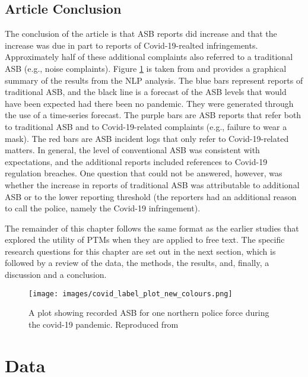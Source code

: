 \subsection{Article Conclusion}The conclusion of the article is that ASB reports did increase and that the increase was due in part to reports of Covid-19-realted infringements. Approximately half of these additional complaints also referred to a traditional ASB (e.g., noise complaints). Figure \ref{fig:ASB}  is taken from \parencite{halford_dixon_farrell_2022}  and provides a graphical summary of the results from the NLP analysis. The blue bars represent reports of traditional ASB, and the black line is a forecast of the ASB levels that would have been expected had there been no pandemic. They were generated through the use of a time-series forecast. The purple bars are ASB reports that refer both to traditional ASB and to Covid-19-related complaints (e.g., failure to wear a mask). The red bars are ASB incident logs that only refer to Covid-19-related matters. In general, the level of conventional ASB was consistent with expectations, and the additional reports included references to Covid-19 regulation breaches. One question that could not be answered, however, was whether the increase in reports of traditional ASB was attributable to additional ASB or to the lower reporting threshold (the reporters had an additional reason to call the police, namely the Covid-19 infringement).

The remainder of this chapter follows the same format as the earlier studies that explored the utility of PTMs when they are applied to free text. The specific research questions for this chapter are set out in the next section, which is followed by a review of the data, the methods, the results, and, finally, a discussion and a conclusion.


\begin{figure}
  \texttt{[image: images/covid\_label\_plot\_new\_colours.png]}
  \caption[ASB in the Pandemic]{A plot showing recorded ASB for one northern police force during the covid-19 pandemic.  Reproduced from  \textcite{halford_dixon_farrell_2022} }
  \label{fig:ASB}
\end{figure}


\section{Data}

